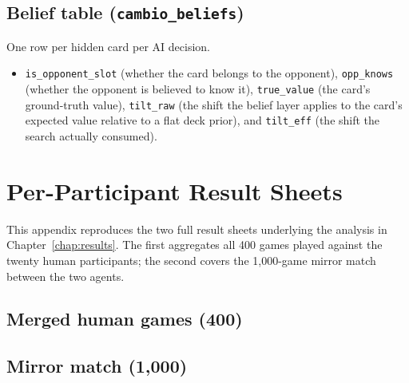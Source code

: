 \documentclass[12pt,a4paper,oneside]{report}
\begin{document}
\begin{appendices}
\section*{Belief table (\texttt{cambio\_beliefs})}
One row per hidden card per AI decision.
\begin{itemize}
  \item \texttt{is\_opponent\_slot} (whether the card belongs to the opponent), \texttt{opp\_knows} (whether the opponent is believed to know it), \texttt{true\_value} (the card's ground-truth value), \texttt{tilt\_raw} (the shift the belief layer applies to the card's expected value relative to a flat deck prior), and \texttt{tilt\_eff} (the shift the search actually consumed).
\end{itemize}

\chapter{Per-Participant Result Sheets}
\label{app:pertester}

This appendix reproduces the two full result sheets underlying the analysis in Chapter~\ref{chap:results}. The first aggregates all 400 games played against the twenty human participants; the second covers the 1{,}000-game mirror match between the two agents.

\section*{Merged human games (400)}


\section*{Mirror match (1{,}000)}


\end{appendices}
\end{document}
